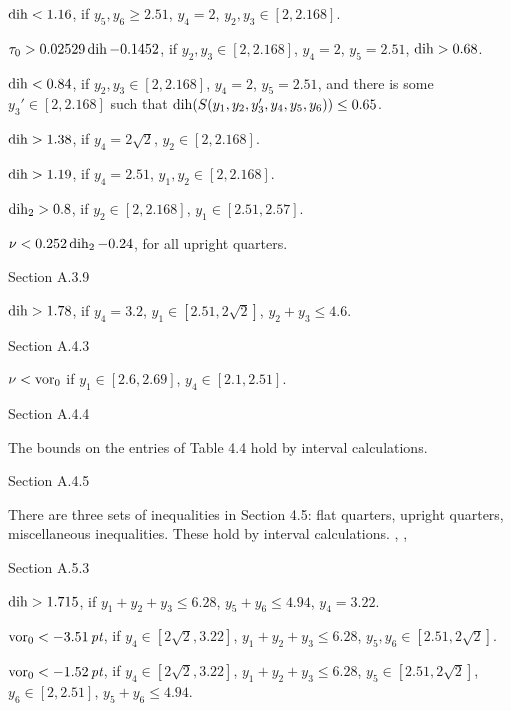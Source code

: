 $\operatorname{dih}<1.16$, if $y_5,y_6\ge 2.51$, $y_4=2$, $y_2,y_3\in[2,2.168]$.

$\tau_0 > 0.02529 \operatorname{dih} - 0.1452$, if $y_2,y_3\in[2,2.168]$,
		$y_4=2$, $y_5=2.51$, $\operatorname{dih}>0.68$.

$\operatorname{dih} < 0.84$, if $y_2,y_3\in[2,2.168]$, $y_4=2$, $y_5=2.51$,
	and there is some $y_3'\in[2,2.168]$ such that
	$\operatorname{dih}(S(y_1,y_2,y_3',y_4,y_5,y_6))\le 0.65$.

$\operatorname{dih}>1.38$, if $y_4=2\sqrt2$, $y_2\in[2,2.168]$.

$\operatorname{dih}>1.19$, if $y_4=2.51$, $y_1,y_2\in[2,2.168]$.

$\operatorname{dih}_2>0.8$, if $y_2\in[2,2.168]$, $y_1\in[2.51,2.57]$.

$\nu < 0.252\operatorname{dih}_2 - 0.24$, for all upright quarters.

\subhead Section A.3.9\endsubhead

$\operatorname{dih}>1.78$, if 
	$y_4=3.2$, $y_1\in[2.51,2\sqrt2]$, $y_2+y_3\le4.6$.

\subhead Section A.4.3\endsubhead

$\nu < \operatorname{vor}_0$ if $y_1\in[2.6,2.69]$, $y_4\in[2.1,2.51]$.

\subhead Section A.4.4\endsubhead

The bounds on the entries of Table 4.4 hold by interval
calculations.

\subhead Section A.4.5\endsubhead

There are three sets of inequalities in Section 4.5: flat
quarters, upright quarters, miscellaneous inequalities.
These hold by interval calculations.
	, , 


\subhead Section A.5.3\endsubhead

$\operatorname{dih}>1.715$, if $y_1+y_2+y_3\le6.28$, $y_5+y_6\le4.94$, $y_4=3.22$.

$\operatorname{vor}_0 < -3.51\,\hbox{\it pt}$, if $y_4\in[2\sqrt2,3.22]$, $y_1+y_2+y_3\le 6.28$,
	$y_5,y_6\in[2.51,2\sqrt2]$.

$\operatorname{vor}_0 < -1.52\,\hbox{\it pt}$, if $y_4\in[2\sqrt2,3.22]$,
	$y_1+y_2+y_3\le 6.28$, $y_5\in[2.51,2\sqrt2]$, $y_6\in[2,2.51]$,
		$y_5+y_6\le4.94$.


\bye
